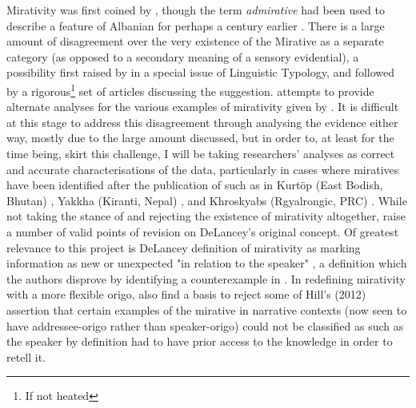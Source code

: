 Mirativity was first coined by , though the term \textit{admirative} had been used to describe a feature of Albanian for perhaps a century earlier \cite{Aikhenvald2012Mirative}. There is a large amount of disagreement over the very existence of the Mirative as a separate category (as opposed to a secondary meaning of a sensory evidential), a possibility first raised by  in a special issue of Linguistic Typology, and followed by a rigorous\footnote{If not heated} set of articles discussing the suggestion.  attempts to provide alternate analyses for the various examples of mirativity given by . It is difficult at this stage to address this disagreement through analysing the evidence either way, mostly due to the large amount discussed, but in order to, at least for the time being, skirt this challenge, I will be taking researchers' analyses as correct and accurate characterisations of the data, particularly in cases where miratives have been identified after the publication of  such as in Kurtöp (East Bodish, Bhutan) \cite{Hyslop2017}, Yakkha (Kiranti, Nepal) \cite{Schackow2015}, and Khroskyabs (Rgyalrongic, PRC) \cites{Lai2017}{TaylorAdams2020}. While not taking the stance of  and rejecting the existence of mirativity altogether,  raise a number of valid points of revision on DeLancey's original concept. Of greatest relevance to this project is DeLancey definition of mirativity as marking information as new or unexpected "in relation to the speaker" \cite[488]{HengeveldOlbertz2012}, a definition which the authors disprove by identifying a counterexample in . In redefining mirativity with a more flexible origo,  also find a basis to reject some of Hill's (2012) assertion that certain examples of the mirative in narrative contexts (now seen to have addressee-origo rather than speaker-origo) could not be classified as such as the speaker by definition had to have prior access to the knowledge in order to retell it.

